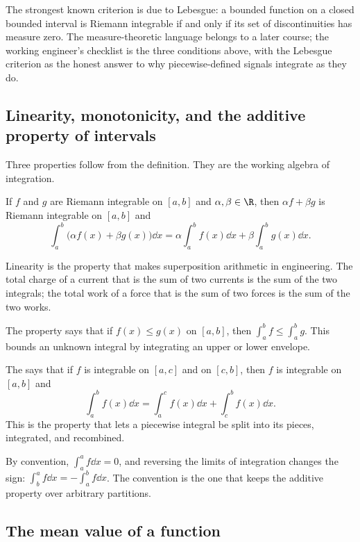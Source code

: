 The strongest known criterion is due to Lebesgue: a bounded function
on a closed bounded interval is Riemann integrable if and only if
its set of discontinuities has measure zero. The measure-theoretic
language belongs to a later course; the working engineer's checklist
is the three conditions above, with the Lebesgue criterion as the
honest answer to why piecewise-defined signals integrate as they do.

\subsection{Linearity, monotonicity, and the additive property of
intervals}

Three properties follow from the definition. They are the working
algebra of integration.

\begin{principle}
If $f$ and $g$ are Riemann integrable on $[a,b]$ and $\alpha, \beta
\in \R$, then $\alpha f + \beta g$ is Riemann integrable on $[a,b]$
and
\[
\int_{a}^{b} \bigl(\alpha f(x) + \beta g(x)\bigr) \dd x =
\alpha \int_{a}^{b} f(x) \dd x + \beta \int_{a}^{b} g(x) \dd x.
\]
\end{principle}

Linearity is the property that makes superposition arithmetic in
engineering. The total charge of a current that is the sum of two
currents is the sum of the two integrals; the total work of a force
that is the sum of two forces is the sum of the two works.

The  property says that if $f(x) \leq g(x)$ on
$[a,b]$, then $\int_{a}^{b} f \leq \int_{a}^{b} g$. This bounds an
unknown integral by integrating an upper or lower envelope.

The  says that if $f$ is
integrable on $[a,c]$ and on $[c,b]$, then $f$ is integrable on
$[a,b]$ and
\[
\int_{a}^{b} f(x) \dd x = \int_{a}^{c} f(x) \dd x +
\int_{c}^{b} f(x) \dd x.
\]
This is the property that lets a piecewise integral be split into
its pieces, integrated, and recombined.

By convention, $\int_{a}^{a} f \dd x = 0$, and reversing the limits
of integration changes the sign:
$\int_{b}^{a} f \dd x = - \int_{a}^{b} f \dd x$. The convention is
the one that keeps the additive property over arbitrary partitions.

\subsection{The mean value of a function}

